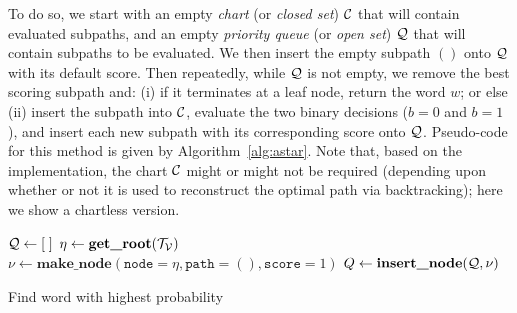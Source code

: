 \documentclass[a4paper]{article}
\begin{document}
To do so, we start with an empty {\em chart} (or {\em closed set}) ${\cal C}$ that will contain evaluated subpaths,
and an empty {\em priority queue} (or {\em open set}) ${\cal Q}$ that will contain subpaths to be evaluated.
We then insert the empty subpath $()$ onto ${\cal Q}$ with its default score.
Then repeatedly, while ${\cal Q}$ is not empty, we remove the best scoring subpath and: (i) if it terminates at a leaf node, return the word $w$;
or else (ii) insert the subpath into ${\cal C}$, evaluate the two binary decisions ($b=0$ and $b=1$), and insert each new subpath with its corresponding score onto ${\cal Q}$.
Pseudo-code for this method is given by Algorithm~\ref{alg:astar}.
Note that, based on the implementation, the chart ${\cal C}$ might or might not be required (depending upon whether or not it is used to reconstruct the optimal path via backtracking);
here we show a chartless version.
\begin{algorithm}[hbt]
 \SetAlgoLined
 \BlankLine
 ${\cal Q}\leftarrow [\;]$
 $\eta\leftarrow\textbf{get\_root}({\cal T}_{\cal V})$
 $\nu\leftarrow\textbf{make\_node}(\texttt{node}=\eta, \texttt{path}=(),\texttt{score}=1)$
 $Q\leftarrow\textbf{insert\_node}({\cal Q}, \nu)$
 \caption{Find word with highest probability}
 \label{alg:astar}
\end{algorithm}
\end{document}
